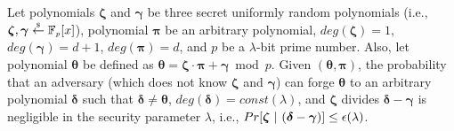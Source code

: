\vspace{-1mm}
\begin{theorem}\label{proof::unforgeable-poly}
%
Let polynomials $\bm\zeta$ and $\bm\gamma$ be three secret uniformly random polynomials (i.e., $\bm\zeta, \bm\gamma\stackrel{\scriptscriptstyle\$}\leftarrow \mathbb F_{\scriptscriptstyle p}[x]$), polynomial $\bm\pi$ be an arbitrary polynomial,   $deg(\bm\zeta)= 1,$ $ deg(\bm\gamma)= d+1$,  $deg(\bm\pi)=d$, and $p$ be a $\lambda$-bit prime number. Also, let polynomial $\bm\theta$ be defined as  $\bm\theta=\bm\zeta\cdot\bm \pi+\bm \gamma \bmod p$. Given $(\bm\theta,\bm\pi)$, the probability that an adversary (which does not know $\bm\zeta$ and $\bm\gamma$) can forge $\bm\theta$ to an arbitrary polynomial $\bm\delta$ such that  $\bm\delta\neq \bm\theta$, $deg(\bm\delta)= const(\lambda)$, and $\bm\zeta$ divides $\bm\delta-\bm\gamma$ is negligible in the security parameter $\lambda$, i.e., 
%
$Pr[ \bm\zeta \ | \ (\bm\delta-\bm\gamma) ]\leq \negl(\lambda)$.

\end{theorem}


%
%

